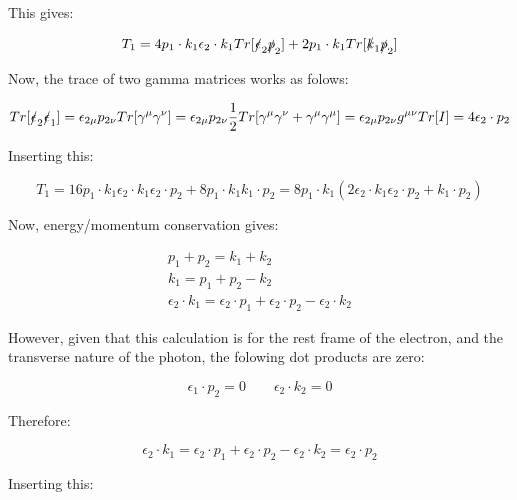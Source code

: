 \documentclass[a4]{article}
\begin{document}
    This gives:

    \begin{equation}
        T_1 = 4 p_1 \cdot k_1 \epsilon_2 \cdot k_1 Tr[\slashed{\epsilon}_2 \slashed{p}_2] + 2 p_1 \cdot k_1 Tr[\slashed{k}_1 \slashed{p}_2]
    \end{equation}

    Now, the trace of two gamma matrices works as folows:

    \begin{equation}
        Tr [\slashed{\epsilon}_2 \slashed{\epsilon}_1] = \epsilon_{2 \mu} p_{2 \nu} Tr [\gamma^\mu \gamma^\nu] = \epsilon_{2 \mu} p_{2 \nu} \frac{1}{2} Tr [\gamma^\mu \gamma^\nu + \gamma^\mu \gamma^\mu] = \epsilon_{2 \mu} p_{2 \nu} g^{\mu \nu} Tr[I] = 4 \epsilon_2 \cdot p_2
    \end{equation}

    Inserting this:

    \begin{equation}
        T_1 = 16 p_1 \cdot k_1 \epsilon_2 \cdot k_1 \epsilon_2 \cdot p_2 + 8 p_1 \cdot k_1 k_1 \cdot p_2 = 8 p_1 \cdot k_1 (2 \epsilon_2 \cdot k_1 \epsilon_2 \cdot p_2 + k_1 \cdot p_2)
    \end{equation}

    Now, energy/momentum conservation gives:

    \begin{eqnarray}
        p_1 + p_2 = k_1 + k_2 \\
        k_1 = p_1 + p_2 - k_2 \\
        \epsilon_2 \cdot k_1 = \epsilon_2 \cdot p_1 + \epsilon_2 \cdot p_2 - \epsilon_2 \cdot k_2
    \end{eqnarray}

    However, given that this calculation is for the rest frame of the electron, and the transverse nature of the photon, the folowing dot products are zero:

    \begin{equation}
        \epsilon_1 \cdot p_2 = 0 \qquad \epsilon_2 \cdot k_2 = 0
    \end{equation}

    Therefore:

    \begin{equation}
        \epsilon_2 \cdot k_1 = \epsilon_2 \cdot p_1 + \epsilon_2 \cdot p_2 - \epsilon_2 \cdot k_2 = \epsilon_2 \cdot p_2
    \end{equation}

    Inserting this:
\end{document}
